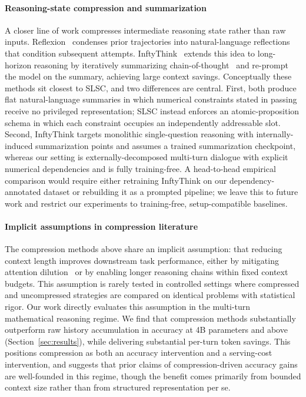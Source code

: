 \paragraph{Reasoning-state compression and summarization}
A closer line of work compresses intermediate reasoning state rather than raw inputs. Reflexion~\citep{shinn2023reflexion} condenses prior
trajectories into natural-language reflections that condition subsequent attempts. InftyThink~\citep{yan2025inftythink} extends this idea to
long-horizon reasoning by iteratively  summarizing chain-of-thought~\citep{wei2022chain} and re-prompt the model on the summary, achieving large context savings.
Conceptually these methods sit closest to SLSC, and two differences are central. First, both produce flat natural-language summaries in which numerical constraints stated in passing receive no privileged representation; SLSC instead enforces an atomic-proposition schema in which each constraint occupies an independently addressable slot. Second, InftyThink targets monolithic single-question reasoning with internally-induced summarization points and assumes a trained summarization checkpoint, whereas our setting is externally-decomposed multi-turn dialogue with explicit numerical dependencies and is fully training-free. A head-to-head
empirical comparison would require either retraining InftyThink on our dependency-annotated dataset or rebuilding it as a prompted pipeline;
we leave this to future work and restrict our experiments to training-free, setup-compatible baselines.

\paragraph{Implicit assumptions in compression literature}
The compression methods above share an implicit assumption: that reducing context length improves downstream task performance, either by
mitigating attention dilution~\citep{liu2024lost} or by enabling longer reasoning chains within fixed context budgets. This assumption is
rarely tested in controlled settings where compressed and uncompressed strategies are compared on identical problems with statistical rigor.
Our work directly evaluates this assumption in the multi-turn mathematical reasoning regime. We find that compression methods substantially
outperform raw history accumulation in accuracy at 4B parameters and above (Section~\ref{sec:results}), while delivering substantial per-turn
token savings. This positions compression as both an accuracy intervention and a serving-cost intervention, and suggests that prior claims of
compression-driven accuracy gains are well-founded in this regime, though the benefit comes primarily from bounded context size rather than
from structured representation per se. 

